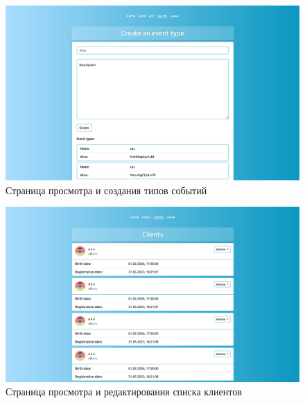\begin{appendices}
\begin{figure}[h!]
	\centering
    \includegraphics[width=\linewidth]{./images/ets.png}
    \caption{Страница просмотра и создания типов событий}
    \label{img:ets}
\end{figure}

\begin{figure}[h!]
	\centering
    \includegraphics[width=\linewidth]{./images/clients.png}
    \caption{Страница просмотра и редактирования списка клиентов}
    \label{img:clients}
\end{figure}

\newpage


\end{appendices}
